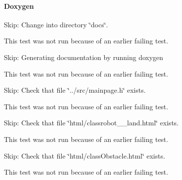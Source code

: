 \paragraph*{Doxygen}


\begin{DoxyItemize}
\item Skip\+: Change into directory \char`\"{}docs\char`\"{}.

This test was not run because of an earlier failing test.
\item Skip\+: Generating documentation by running doxygen

This test was not run because of an earlier failing test.
\item Skip\+: Check that file \char`\"{}../src/mainpage.\+h\char`\"{} exists.

This test was not run because of an earlier failing test.
\item Skip\+: Check that file \char`\"{}html/classrobot\+\_\+\+\_\+land.\+html\char`\"{} exists.

This test was not run because of an earlier failing test.
\item Skip\+: Check that file \char`\"{}html/class\+Obstacle.\+html\char`\"{} exists.

This test was not run because of an earlier failing test. 
\end{DoxyItemize}